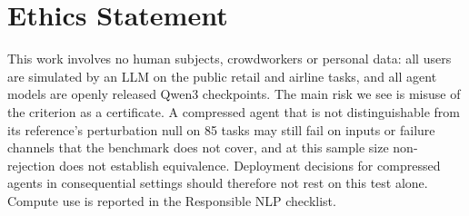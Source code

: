 \section*{Ethics Statement}

This work involves no human subjects, crowdworkers or personal data: all users are simulated by an LLM on the public \tautwo{} retail and airline tasks, and all agent models are openly released Qwen3 checkpoints. The main risk we see is misuse of the criterion as a certificate. A compressed agent that is not distinguishable from its reference's perturbation null on 85 tasks may still fail on inputs or failure channels that the benchmark does not cover, and at this sample size non-rejection does not establish equivalence. Deployment decisions for compressed agents in consequential settings should therefore not rest on this test alone. Compute use is reported in the Responsible NLP checklist.
